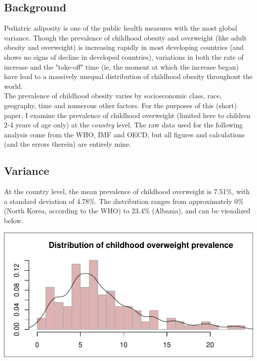 \documentclass[11pt]{article}
\begin{document}
\begin{multicols}{2} 

\subsection*{Background}

Pediatric adiposity is one of the public health measures with the most global variance.  Though the prevalence of childhood obesity and overweight (like adult obesity and overweight) is increasing rapidly in most developing countries (and shows no signs of decline in developed countries), variations in both the rate of increase and the "take-off" time (ie, the moment at which the increase began) have lead to a massively unequal distribution of childhood obesity throughout the world.  \\

The prevalence of childhood obesity varies by socioeconomic class, race, geography, time and numerous other factors.  For the purposes of this (short) paper, I examine the prevalence of childhood overweight (limited here to children 2-4 years of age only) at the \emph{country} level.  The raw data used for the following analysis come from the WHO, IMF and OECD, but all figures and calculations (and the errors therein) are entirely mine. \\

\subsection*{Variance}
At the country level, the mean prevalence of childhood overweight is 7.51\%, with a standard deviation of 4.78\%.  The distribution ranges from approximately 0\% (North Korea, according to the WHO) to 23.4\% (Albania), and can be visualized below.\\

\begin{center}
\includegraphics{global_variance-003}
\end{center}


\end{multicols}
\end{document}
